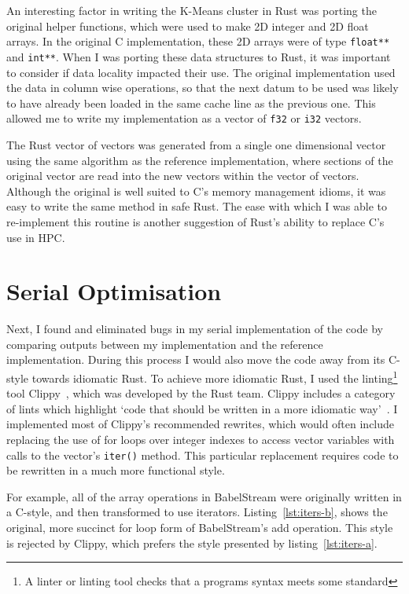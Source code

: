 An interesting factor in writing the K-Means cluster in Rust was porting the original helper functions, which were used to make 2D integer and 2D float arrays. In the original C implementation, these 2D arrays were of type \texttt{float**} and \texttt{int**}.
When I was porting these data structures to Rust, it was important to consider if data locality impacted their use. The original implementation used the data in column wise operations, so that the next datum to be used was likely to have already been loaded in the same cache line as the previous one. This allowed me to write my implementation as a vector of \texttt{f32} or \texttt{i32} vectors.

The Rust vector of vectors was generated from a single one dimensional vector using the same algorithm as the reference implementation, where sections of the original vector are read into the new vectors within the vector of vectors. Although the original is well suited to C's memory management idioms, it was easy to write the same method in safe Rust. The ease with which I was able to re-implement this routine is another suggestion of Rust's ability to replace C's use in HPC.

\section{Serial Optimisation}
Next, I found and eliminated bugs in my serial implementation of the code by comparing outputs between my implementation and the reference implementation. During this process I would also move the code away from its C-style towards idiomatic Rust. To achieve more idiomatic Rust, I used the linting\footnote{A linter or linting tool checks that a programs syntax meets some standard} tool Clippy~\cite{RustClippy}, which was developed by the Rust team.  Clippy includes a category of lints  which highlight `code that should be written in a more idiomatic way'~\cite{RustClippy}. I implemented most of Clippy's recommended rewrites, which would often include replacing the use of for loops over integer indexes to access vector variables with calls to the vector's \texttt{iter()} method. This particular replacement requires code to be rewritten in a much more functional style.

For example, all of the array operations in BabelStream were originally written in a C-style, and then transformed to use iterators. Listing~\ref{lst:iters-b}, shows the original, more succinct for loop form of BabelStream's add operation. This style is rejected by Clippy, which prefers the style presented by listing~\ref{lst:iters-a}.

